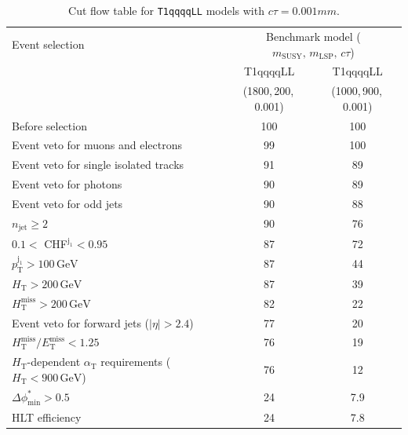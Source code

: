 \clearpage
\begin{table}[!h]
  \caption{Cut flow table for \texttt{T1qqqqLL} models with $c\tau = 0.001\unit{mm}$.} 
  \label{tab:cut_flow_ctau_0p001}
{\scriptsize%
\centering
\begin{tabular}{lcc}
  \hline
  Event selection & \multicolumn{2}{c}{Benchmark model ($m_\mathrm{SUSY},\,m_\mathrm{LSP},\,c\tau$)} \\
  \cline{2-3}
   & T1qqqqLL & T1qqqqLL \\
   & (1800,\,200,\,0.001) & (1000,\,900,\,0.001) \\
  \hline
  Before selection & 100\phantom{.1} & 100\phantom{.1} \\
  Event veto for muons and electrons & \phantom{1}99\phantom{.1} & 100\phantom{.1} \\
  Event veto for single isolated tracks & \phantom{1}91\phantom{.1} & \phantom{1}89\phantom{.1}  \\
  Event veto for photons & \phantom{1}90\phantom{.1} & \phantom{1}89\phantom{.1} \\
  Event veto for odd jets & \phantom{1}90\phantom{.1} & \phantom{1}88\phantom{.1} \\
   $n_{\mathrm{jet}} \geq 2$ & \phantom{1}90\phantom{.1} & \phantom{1}76\phantom{.1}  \\
   $0.1 <$ CHF$^{\mathrm{j_1}} < 0.95$ & \phantom{1}87\phantom{.1} & \phantom{1}72\phantom{.1} \\
   $p_{\mathrm{T}}^{\mathrm{j_1}} > 100\,\mathrm{GeV}$ & \phantom{1}87\phantom{.1} & \phantom{1}44\phantom{.1} \\
   $H_{\mathrm{T}} > 200\,\mathrm{GeV}$ & \phantom{1}87\phantom{.1} & \phantom{1}39\phantom{.1}  \\
  $H_{\mathrm{T}}^{\mathrm{miss}} > 200\,\mathrm{GeV}$ & \phantom{1}82\phantom{.1} & \phantom{1}22\phantom{.1}  \\
  Event veto for forward jets ($|\eta| > 2.4$) & \phantom{1}77\phantom{.1} & \phantom{1}20\phantom{.1}  \\
  $H_{\mathrm{T}}^{\mathrm{miss}} / E_{\mathrm{T}}^{\mathrm{miss}} < 1.25$ & \phantom{1}76\phantom{.1} & \phantom{1}19\phantom{.1}  \\
  $H_{\mathrm{T}}$-dependent $\alpha_{\mathrm{T}}$ requirements ($H_{\mathrm{T}} < 900\,\mathrm{GeV}$) & \phantom{1}76\phantom{.1} & \phantom{1}12\phantom{.1} \\
  $\Delta\phi^{*}_{\mathrm{min}} > 0.5$ & \phantom{1}24\phantom{.1} & \phantom{10}7.9  \\
  \hline
  HLT efficiency & \phantom{1}24\phantom{.1} & \phantom{10}7.8 \\
  \hline
\end{tabular}
}
\end{table}


